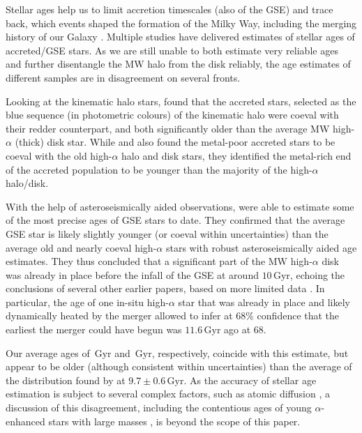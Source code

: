 \documentclass[fleqn,usenatbib]{mnras}
\newcommand{\Gyr}{\,\mathrm{Gyr}}	%
\begin{document}
Stellar ages help us to limit accretion timescales (also of the GSE) and trace back, which events shaped the formation of the Milky Way, including the merging history of our Galaxy \citep{Wyse2001}. Multiple studies \citep[e.g.][]{Jofre2010, Schuster2012, Hawkins2014, Gallart2019, Das2020, Montalban2021} have delivered estimates of stellar ages of accreted/GSE stars. As we are still unable to both estimate very reliable ages and further disentangle the MW halo from the disk reliably, the age estimates of different samples are in disagreement on several fronts.

Looking at the kinematic halo stars, \citet{Gallart2019} found that the accreted stars, selected as the blue sequence (in photometric colours) of the kinematic halo were coeval with their redder counterpart, and both significantly older than the average MW high-$\alpha$ (thick) disk star. While \citet{Schuster2012} and \citet{Hawkins2014} also found the metal-poor accreted stars to be coeval with the old high-$\alpha$ halo and disk stars, they identified the metal-rich end of the accreted population to be younger than the majority of the high-$\alpha$ halo/disk.

With the help of asteroseismically aided observations, \citet{Montalban2021} were able to estimate some of the most precise ages of GSE stars to date. They confirmed that the average GSE star is likely slightly younger (or coeval within uncertainties) than the average old and nearly coeval high-$\alpha$ stars \citep{Miglio2021} with robust asteroseismically aided age estimates. They thus concluded that a significant part of the MW high-$\alpha$ disk was already in place before the infall of the GSE at around $10\Gyr$, echoing the conclusions of several other earlier papers, based on more limited data \citep[e.g.][and references therein]{Wyse2001}. In particular, the age of one in-situ high-$\alpha$ star that was already in place and likely dynamically heated by the merger allowed \citep{Chaplin2020} to infer at 68\% confidence that the earliest the merger could have begun was $11.6\Gyr$ ago at 68.

Our average ages of $\Gyr$ and $\Gyr$, respectively, coincide with this estimate, but appear to be older (although consistent within uncertainties) than the average of the distribution found by \citet{Montalban2021} at $9.7\pm0.6\Gyr$. As the accuracy of stellar age estimation is subject to several complex factors, such as atomic diffusion \citep[see e.g.][]{Jofre2011}, a discussion of this disagreement, including the contentious ages of young $\alpha$-enhanced stars with large masses \citep[e.g.][]{Chiappini2015,Zhang2021}, is beyond the scope of this paper.
\end{document}
